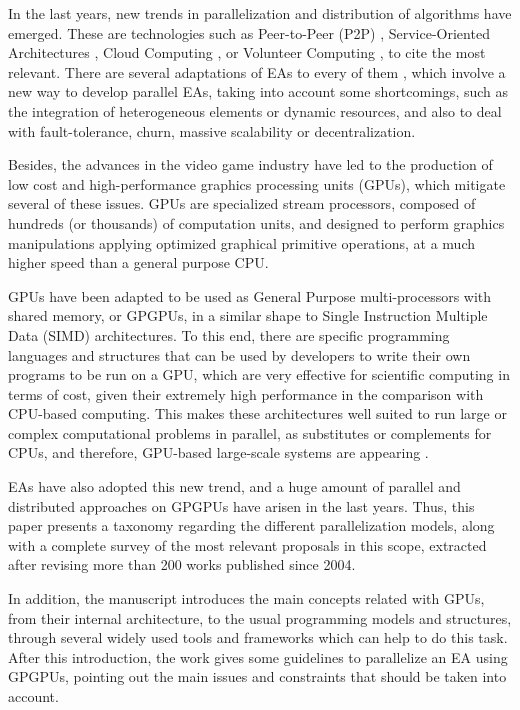 \documentclass{article}
\begin{document}
In the last years, new trends in parallelization and
distribution of algorithms have emerged. These are technologies such as Peer-to-Peer (P2P) \cite{P2P-wikipedia}, Service-Oriented Architectures \cite{SOA-wikipedia}, Cloud Computing \cite{CloudComputing-wikipedia}, or Volunteer Computing \cite{VolunteerComputing-wikipedia}, to cite the most relevant. There are several adaptations of EAs to every of them \cite{laredo2010evag,SOA-Garcia-SanchezGCAG13,Meri_CloudEA13,Volunteer-LaredoBGVAGF14}, 
which involve a new way to develop parallel EAs, taking into account some shortcomings, such as the integration of heterogeneous elements or dynamic resources, and also to deal with fault-tolerance, churn, massive
scalability or decentralization.

Besides, the advances in the video game industry have led to the production of low cost and high-performance graphics processing units (GPUs), which mitigate several of these issues. 
GPUs are specialized stream processors, composed of hundreds (or
thousands) of computation units, and designed to perform graphics
manipulations applying optimized graphical primitive operations, at a
much higher speed than a general purpose CPU. 

GPUs have been adapted to be used as General Purpose multi-processors
with shared memory, or GPGPUs, in a similar shape to Single
Instruction Multiple Data (SIMD)\cite{SIMD-wikipedia} architectures. 
To this end, there are specific programming languages and structures that can be used by developers to write their own programs to be run on a GPU, which are very effective for scientific computing in terms of cost, given their extremely high performance in the comparison with CPU-based computing.
This makes these architectures well suited to run large or complex computational problems in parallel, as substitutes or complements for CPUs, and therefore, GPU-based large-scale systems are appearing \cite{KindratenkoTrends11}.

EAs have also adopted this new trend, and a huge amount of parallel and distributed approaches on GPGPUs have arisen in the last years.
Thus, this paper presents a taxonomy regarding the different
parallelization models, along with a complete survey of the most
relevant proposals in this scope, extracted after revising more than
200 works published since 2004. 

In addition, the manuscript introduces the main concepts related with
GPUs, from their internal architecture, to the usual programming
models and structures, through several widely used tools and
frameworks which can help to do this task. After this introduction, the work gives some guidelines to parallelize an EA using GPGPUs, pointing out the main issues and constraints that should be taken into account. 
\end{document}
